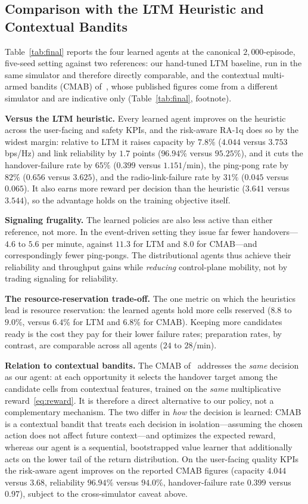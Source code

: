 \documentclass[conference]{IEEEtran}
\begin{document}
\subsection{Comparison with the LTM Heuristic and Contextual Bandits}
\label{sec:results-main}
Table~\ref{tab:final} reports the four learned agents at the canonical
$2{,}000$-episode, five-seed setting against two references: our hand-tuned LTM
baseline, run in the same simulator and therefore directly comparable, and the
contextual multi-armed bandits (CMAB) of~\cite{cmab_ho}, whose published figures
come from a different simulator and are indicative only (Table~\ref{tab:final},
footnote).

\textbf{Versus the LTM heuristic.} Every learned agent improves on the heuristic
across the user-facing and safety KPIs, and the risk-aware RA-1q does so by the
widest margin: relative to LTM it raises capacity by $7.8\%$ ($4.044$ versus
$3.753$\,bps/Hz) and link reliability by $1.7$ points ($96.94\%$ versus
$95.25\%$), and it cuts the handover-failure rate by $65\%$ ($0.399$ versus
$1.151$/min), the ping-pong rate by $82\%$ ($0.656$ versus $3.625$), and the
radio-link-failure rate by $31\%$ ($0.045$ versus $0.065$).
It also earns more reward per decision than the heuristic ($3.641$ versus
$3.544$), so the advantage holds on the training objective itself.

\textbf{Signaling frugality.} The learned policies are also less active than either
reference, not more. In the event-driven setting they issue far fewer
handovers---$4.6$ to $5.6$ per minute, against $11.3$ for LTM and $8.0$ for
CMAB---and correspondingly fewer ping-pongs. The distributional agents thus achieve
their reliability and throughput gains while \emph{reducing} control-plane
mobility, not by trading signaling for reliability.

\textbf{The resource-reservation trade-off.} The one metric on which the
heuristics lead is resource reservation: the learned agents hold more cells
reserved ($8.8$ to $9.0\%$, versus $6.4\%$ for LTM and $6.8\%$ for CMAB). Keeping
more candidates ready is the cost they pay for their lower failure rates;
preparation rates, by contrast, are comparable across all agents ($24$ to
$28$/min).

\textbf{Relation to contextual bandits.} The CMAB of~\cite{cmab_ho} addresses
the \emph{same} decision as our agent: at each opportunity it selects the handover
target among the candidate cells from contextual features, trained on the
\emph{same} multiplicative reward~\eqref{eq:reward}. It is therefore a direct
alternative to our policy, not a complementary mechanism. The two differ in
\emph{how} the decision is learned: CMAB is a contextual bandit that treats each
decision in isolation---assuming the chosen action does not affect future
context---and optimizes the expected reward, whereas our agent is a sequential,
bootstrapped value learner that additionally acts on the lower tail of the return
distribution. On the user-facing quality KPIs the risk-aware agent improves on the
reported CMAB figures (capacity $4.044$ versus $3.68$, reliability $96.94\%$ versus
$94.0\%$, handover-failure rate $0.399$ versus $0.97$), subject to the
cross-simulator caveat above.
\end{document}
